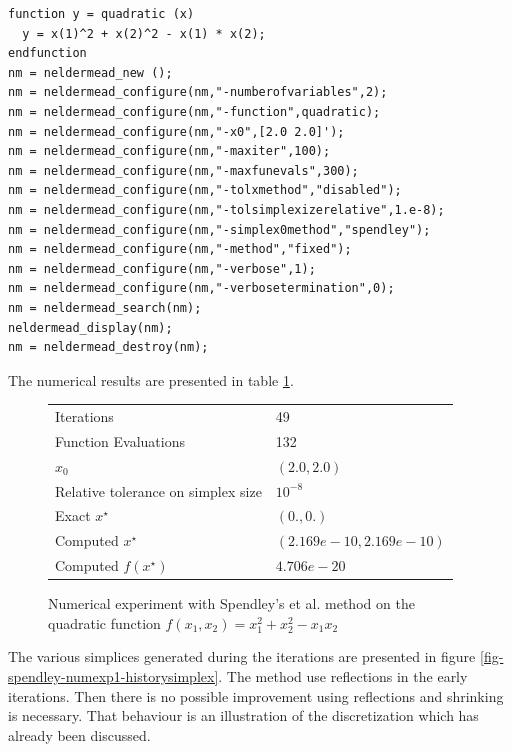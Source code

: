 \lstset{language=scilabscript}
\begin{lstlisting}
function y = quadratic (x)
  y = x(1)^2 + x(2)^2 - x(1) * x(2);
endfunction
nm = neldermead_new ();
nm = neldermead_configure(nm,"-numberofvariables",2);
nm = neldermead_configure(nm,"-function",quadratic);
nm = neldermead_configure(nm,"-x0",[2.0 2.0]');
nm = neldermead_configure(nm,"-maxiter",100);
nm = neldermead_configure(nm,"-maxfunevals",300);
nm = neldermead_configure(nm,"-tolxmethod","disabled");
nm = neldermead_configure(nm,"-tolsimplexizerelative",1.e-8);
nm = neldermead_configure(nm,"-simplex0method","spendley");
nm = neldermead_configure(nm,"-method","fixed");
nm = neldermead_configure(nm,"-verbose",1);
nm = neldermead_configure(nm,"-verbosetermination",0);
nm = neldermead_search(nm);
neldermead_display(nm);
nm = neldermead_destroy(nm);
\end{lstlisting}


The numerical results are presented in table \ref{fig-spendley-numexp1-table}.

\begin{figure}[htbp]
\begin{center}
\begin{tiny}
\begin{tabular}{|l|l|}
\hline
Iterations & 49 \\
Function Evaluations & 132 \\
$x_0$ & $(2.0,2.0)$ \\
Relative tolerance on simplex size & $10^{-8}$ \\
Exact $x^\star$ & $(0.,0.)$\\
Computed $x^\star$ & $(2.169e-10, 2.169e-10)$\\
Computed $f(x^\star)$ & $4.706e-20$\\
\hline
\end{tabular}
\end{tiny}
\end{center}
\caption{Numerical experiment with Spendley's et al. method on the quadratic function
$f(x_1,x_2) = x_1^2 + x_2^2 - x_1 x_2$}
\label{fig-spendley-numexp1-table}
\end{figure}

The various simplices generated during the iterations are 
presented in figure \ref{fig-spendley-numexp1-historysimplex}.
The method use reflections in the early iterations. Then there
is no possible improvement using reflections and shrinking is necessary.
That behaviour is an illustration of the discretization which has already
been discussed.

